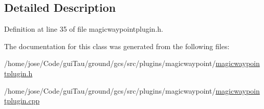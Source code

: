\subsection{Detailed Description}


Definition at line 35 of file magicwaypointplugin.\-h.



The documentation for this class was generated from the following files\-:\begin{DoxyCompactItemize}
\item 
/home/jose/\-Code/gui\-Tau/ground/gcs/src/plugins/magicwaypoint/\hyperlink{magicwaypointplugin_8h}{magicwaypointplugin.\-h}\item 
/home/jose/\-Code/gui\-Tau/ground/gcs/src/plugins/magicwaypoint/\hyperlink{magicwaypointplugin_8cpp}{magicwaypointplugin.\-cpp}\end{DoxyCompactItemize}
